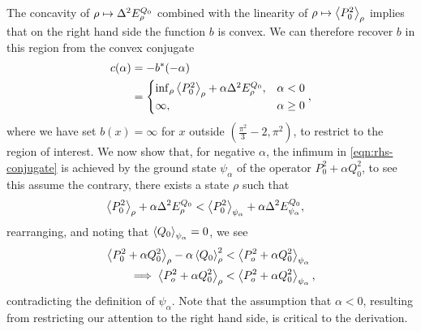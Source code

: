 The concavity of $\rho\mapsto\var{E^{Q_0}_\rho}$ combined with the linearity of $\rho\mapsto \left\langle{P_0^2}\right\rangle_{\rho}$ implies that on the right hand side the function $b$ is convex. We can therefore recover $b$ in this region from the convex conjugate
\begin{align}
  c(\alpha) &= -b^*(-\alpha)\\
  \label{eqn:rhs-conjugate}
            &= \begin{cases}\inf_{\rho}\expe{P_0^2}{\rho} + \alpha\var{E^{Q_0}_\rho}, & \alpha < 0\\
              \infty, & \alpha \geq 0
            \end{cases},
\end{align}
where we have set $b(x) = \infty$ for $x$ outside $\left(\frac{\pi^2}{3} -2,\pi^2\right)$, to restrict to the region of interest. We now show that, for negative $\alpha$, the infimum in \eqref{eqn:rhs-conjugate} is achieved by the ground state $\psi_\alpha$ of the operator $P_0^2 + \alpha Q_0^2$, to see this assume the contrary, there exists a state $\rho$ such that 
\begin{align}
  \expe{P_0^2}{\rho} + \alpha\var{E^{Q_0}_\rho} &< \expe{P_0^2}{\psi_\alpha} + \alpha\var{E^{Q_0}_{\psi_\alpha}},
\end{align}
rearranging, and noting that $\left\langle{Q_0}\right\rangle_{\psi_\alpha} = 0$, we see
\begin{align}
  \left\langle{P_0^2 + \alpha Q_0^2}\right\rangle_{\rho} - \alpha\left\langle{Q_0}\right\rangle_{\rho}^2 &< \left\langle{P_o^2 + \alpha Q_0^2}\right\rangle_{\psi_\alpha}\\
  \implies \left\langle{P_o^2 + \alpha Q_0^2}\right\rangle_{\rho} &< \left\langle{P_o^2 + \alpha Q_0^2}\right\rangle_{\psi_\alpha},
\end{align}
contradicting the definition of $\psi_\alpha$. Note that the assumption that $\alpha < 0$, resulting from restricting our attention to the right hand side, is critical to the derivation. 

